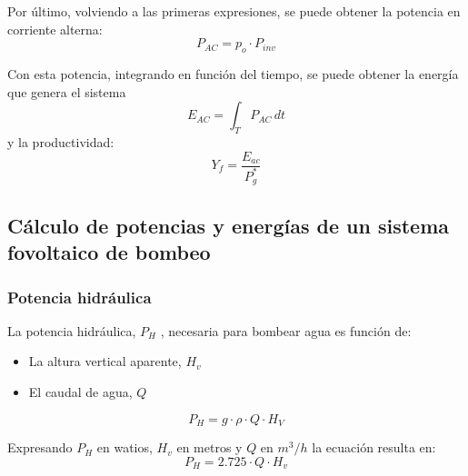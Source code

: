 Por último, volviendo a las primeras expresiones, se puede obtener la potencia en corriente alterna:
\begin{equation}
P_{AC}=p_o\cdot P_{inv}
\end{equation}

Con esta potencia, integrando en función del tiempo, se puede obtener la energía que genera el sistema
\begin{equation}
E_{AC}=\int_{T} P_{AC} \,dt
\end{equation}
y la productividad:
\begin{equation}
Y_f=\frac{E_{ac}}{P_g^*}
\end{equation}

\subsection{Cálculo de potencias y energías de un sistema fovoltaico de bombeo}
\label{sec:orge4ff597}
\subsubsection{Potencia hidráulica}
\label{sec:org93b5939}
La potencia hidráulica, \(P_H\) , necesaria para bombear agua es función de:
\begin{itemize}
\item La altura vertical aparente, \(H_v\) 
\item El caudal de agua, \(Q\)   
\end{itemize}
\begin{equation}
P_H=g\cdot \rho \cdot Q \cdot H_V
\end{equation}

Expresando \(P_H\) en watios, \(H_v\) en metros y \(Q\) en \(m^3/h\) la ecuación resulta en:
\begin{equation}
P_H=2.725\cdot Q \cdot H_v
\end{equation}

